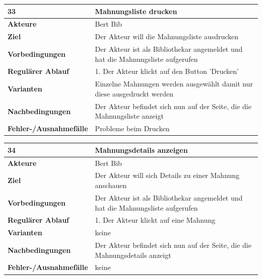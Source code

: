 \documentclass[fontsize=12pt,paper=a4,twoside]{scrartcl}
\begin{document}
\begin{table}[htbp]
\label{33}
\begin{tabular}{|l|p{10cm}|}
\hline 
\textbf{33} & \textbf{Mahnungsliste drucken} \\ \hline
\textbf{Akteure} & Bert Bib\\ \hline
\textbf{Ziel} & Der Akteur will die Mahnungsliste ausdrucken \\ \hline
\textbf{Vorbedingungen} & Der Akteur ist als Bibliothekar angemeldet und hat die Mahnungsliste 
aufgerufen \\ \hline
\textbf{Regulärer Ablauf} & 
1. Der Akteur klickt auf den Button 'Drucken' \\
\hline
\textbf{Varianten} & 
Einzelne Mahnungen werden ausgewählt damit nur diese ausgedruckt werden \\ \hline
\textbf{Nachbedingungen} & Der Akteur befindet sich nun auf der Seite, die die Mahnungsliste 
anzeigt\\ \hline
\textbf{Fehler-/Ausnahmefälle} & Probleme beim Drucken\\
\hline
\end{tabular}
\end{table}

\begin{table}[htbp]
\label{34}
\begin{tabular}{|l|p{10cm}|}
\hline 
\textbf{34} & \textbf{Mahnungsdetails anzeigen} \\ \hline
\textbf{Akteure} & Bert Bib\\ \hline
\textbf{Ziel} & Der Akteur will sich Details zu einer Mahnung anschauen \\ \hline
\textbf{Vorbedingungen} & Der Akteur ist als Bibliothekar angemeldet und hat die Mahnungsliste 
aufgerufen \\ \hline
\textbf{Regulärer Ablauf} & 
1. Der Akteur klickt auf eine Mahnung \\
\hline
\textbf{Varianten} & 
keine \\ \hline
\textbf{Nachbedingungen} & Der Akteur befindet sich nun auf der Seite, die die Mahnungsdetails 
anzeigt\\ \hline
\textbf{Fehler-/Ausnahmefälle} & keine\\
\hline
\end{tabular}
\end{table}
\end{document}
